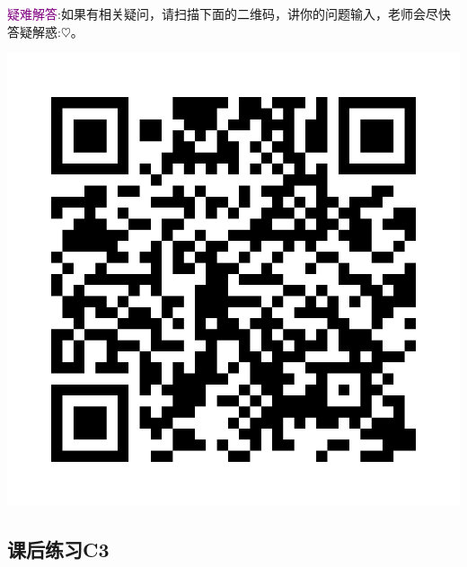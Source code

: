 \documentclass[12pt]{article}
\numberwithin{equation}{section}
\numberwithin{figure}{section}
\begin{document}
\noindent
\textcolor{purple}{疑难解答}:如果有相关疑问，请扫描下面的二维码，讲你的问题输入，老师会尽快答疑解惑:$\heartsuit$。 \begin{marginfigure}
	\centering
	\includegraphics[width=\textwidth]{fig/C3C2qrcode}
\end{marginfigure}


\newpage
\subsection{课后练习C3}
\end{document}
